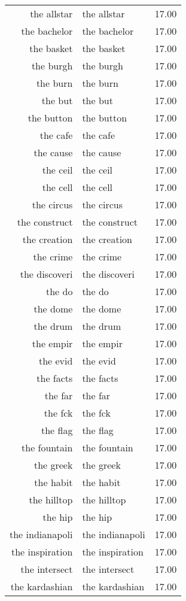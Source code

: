 \begin{table}[ht]
\begin{tabular}{rlr}
  the allstar & the allstar & 17.00 \\ 
  the bachelor & the bachelor & 17.00 \\ 
  the basket & the basket & 17.00 \\ 
  the burgh & the burgh & 17.00 \\ 
  the burn & the burn & 17.00 \\ 
  the but & the but & 17.00 \\ 
  the button & the button & 17.00 \\ 
  the cafe & the cafe & 17.00 \\ 
  the cause & the cause & 17.00 \\ 
  the ceil & the ceil & 17.00 \\ 
  the cell & the cell & 17.00 \\ 
  the circus & the circus & 17.00 \\ 
  the construct & the construct & 17.00 \\ 
  the creation & the creation & 17.00 \\ 
  the crime & the crime & 17.00 \\ 
  the discoveri & the discoveri & 17.00 \\ 
  the do & the do & 17.00 \\ 
  the dome & the dome & 17.00 \\ 
  the drum & the drum & 17.00 \\ 
  the empir & the empir & 17.00 \\ 
  the evid & the evid & 17.00 \\ 
  the facts & the facts & 17.00 \\ 
  the far & the far & 17.00 \\ 
  the fck & the fck & 17.00 \\ 
  the flag & the flag & 17.00 \\ 
  the fountain & the fountain & 17.00 \\ 
  the greek & the greek & 17.00 \\ 
  the habit & the habit & 17.00 \\ 
  the hilltop & the hilltop & 17.00 \\ 
  the hip & the hip & 17.00 \\ 
  the indianapoli & the indianapoli & 17.00 \\ 
  the inspiration & the inspiration & 17.00 \\ 
  the intersect & the intersect & 17.00 \\ 
  the kardashian & the kardashian & 17.00 \\ 

\end{tabular}
\end{table}
